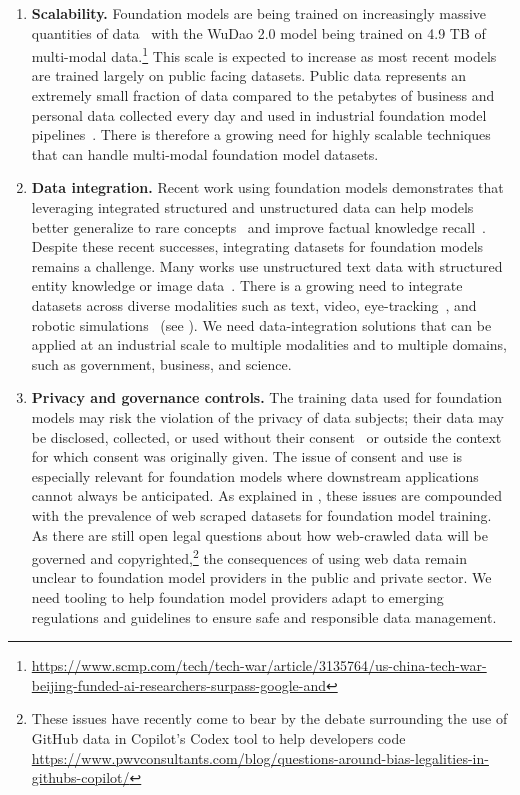 \begin{enumerate}
    \item \textbf{Scalability.} Foundation models are being trained on increasingly massive quantities of data~\citep{kaplan2020} with the WuDao 2.0 model being trained on 4.9 TB of multi-modal data.\footnote{\url{https://www.scmp.com/tech/tech-war/article/3135764/us-china-tech-war-beijing-funded-ai-researchers-surpass-google-and}} This scale is expected to increase as most recent models are trained largely on public facing datasets. Public data represents an extremely small fraction of data compared to the petabytes of business and personal data collected every day and used in industrial foundation model pipelines~\citep{marr2017}. There is therefore a growing need for highly scalable techniques that can handle multi-modal foundation model datasets.

    \item \textbf{Data integration.} 
    Recent work using foundation models demonstrates that leveraging integrated structured and unstructured data can help models better generalize to rare concepts~\citep{orr2020bootleg} and improve factual knowledge recall~\citep{orr2020bootleg, logeswaran2019entdesc, Zhang2019ERNIEEL, Peters2019KnowledgeEC,perner2020ebert}. Despite these recent successes, integrating datasets for foundation models remains a challenge. Many works use unstructured text data with structured entity knowledge or image data~\citep{antol2015vqa}. There is a growing need to integrate datasets across diverse modalities such as text, video, eye-tracking~\citep{hollenstein-etal-2020-zuco}, and robotic simulations~\citep{lynchlanguage} (see ). We need data-integration solutions that can be applied at an industrial scale to multiple modalities and to multiple domains, such as government, business, and science.
    
    \item \textbf{Privacy and governance controls.} The training data used for foundation models may risk the violation of the privacy of data subjects; their data may be disclosed, collected, or used without their consent~\citep{jo2020lessons} or outside the context for which consent was originally given. 
    The issue of consent and use is especially relevant for foundation models where downstream applications cannot always be anticipated.
    As explained in , these issues are compounded with the prevalence of web scraped datasets for foundation model training. As there are still open legal questions about how web-crawled data will be governed and copyrighted,\footnote{These issues have recently come to bear by the debate surrounding the use of GitHub data in Copilot's Codex tool to help developers code \url{https://www.pwvconsultants.com/blog/questions-around-bias-legalities-in-githubs-copilot/}} the consequences of using web data remain unclear to foundation model providers in the public and private sector. We need tooling to help foundation model providers adapt to emerging regulations and guidelines to ensure safe and responsible data management.
    

\end{enumerate}
